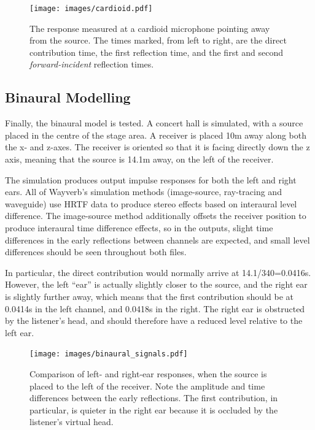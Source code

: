 \documentclass[]{scrreprt}
\begin{document}
\begin{figure}[htbp]
\centering
\texttt{[image: images/cardioid.pdf]}
\caption{The response measured at a cardioid microphone pointing away
from the source. The times marked, from left to right, are the direct
contribution time, the first reflection time, and the first and second
\emph{forward-incident} reflection times.\label{fig:cardioid}}
\end{figure}

\subsection{Binaural Modelling}\label{binaural-modelling}

Finally, the binaural model is tested. A concert hall is simulated, with
a source placed in the centre of the stage area. A receiver is placed
10m away along both the x- and z-axes. The receiver is oriented so that
it is facing directly down the z axis, meaning that the source is 14.1m
away, on the left of the receiver.

The simulation produces output impulse responses for both the left and
right ears. All of Wayverb's simulation methods (image-source,
ray-tracing and waveguide) use HRTF data to produce stereo effects based
on interaural level difference. The image-source method additionally
offsets the receiver position to produce interaural time difference
effects, so in the outputs, slight time differences in the early
reflections between channels are expected, and small level differences
should be seen throughout both files.

In particular, the direct contribution would normally arrive at
14.1/340=0.0416s. However, the left ``ear'' is actually slightly closer
to the source, and the right ear is slightly further away, which means
that the first contribution should be at 0.0414s in the left channel,
and 0.0418s in the right. The right ear is obstructed by the listener's
head, and should therefore have a reduced level relative to the left
ear.

\begin{figure}[htbp]
\centering
\texttt{[image: images/binaural\_signals.pdf]}
\caption{Comparison of left- and right-ear responses, when the source is
placed to the left of the receiver. Note the amplitude and time
differences between the early reflections. The first contribution, in
particular, is quieter in the right ear because it is occluded by the
listener's virtual head.}
\end{figure}
\end{document}
